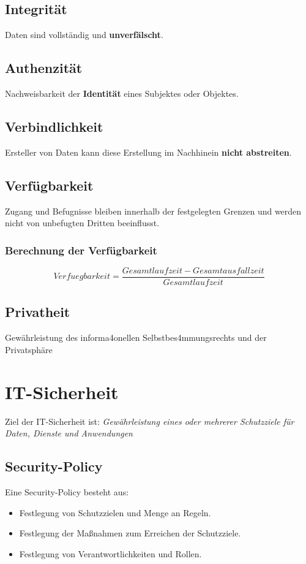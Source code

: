 \documentclass{report}
\begin{document}
\subsection{Integrität}
Daten sind vollständig und \textbf{unverfälscht}.
\subsection{Authenzität}
Nachweisbarkeit der \textbf{Identität} eines Subjektes oder Objektes.

\subsection{Verbindlichkeit}
Ersteller von Daten kann diese Erstellung im Nachhinein \textbf{nicht abstreiten}.

\subsection{Verfügbarkeit}
Zugang und Befugnisse bleiben innerhalb der festgelegten Grenzen und werden nicht von unbefugten Dritten beeinflusst.

\subsubsection{Berechnung der Verfügbarkeit}
$$Verfuegbarkeit = \frac{Gesamtlaufzeit - Gesamtausfallzeit}{Gesamtlaufzeit}$$

\subsection{Privatheit}
Gewährleistung des informa4onellen Selbstbes4mmungsrechts und der Privatsphäre

\section{IT-Sicherheit}
Ziel der IT-Sicherheit ist: \textit{Gewährleistung eines oder mehrerer Schutzziele für Daten, Dienste und
Anwendungen}

\subsection{Security-Policy}
Eine Security-Policy besteht aus:
\begin{itemize}
    \item Festlegung von Schutzzielen und Menge an Regeln.
    \item Festlegung der Maßnahmen zum Erreichen der Schutzziele.
    \item Festlegung von Verantwortlichkeiten und Rollen.
\end{itemize}
\end{document}
